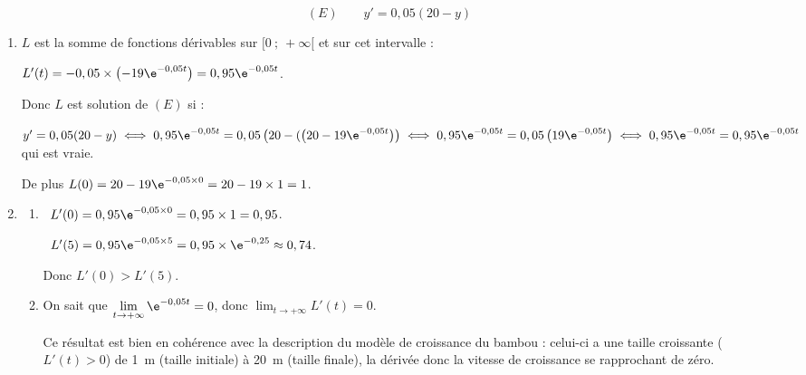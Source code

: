 \[(E) \qquad y' = 0,05(20 - y)\]

%
%
%

\begin{enumerate}
\item %
$L$ est la somme  de fonctions dérivables sur $[0~;~+\infty[$ et sur cet intervalle :

$L'(t) = - 0,05 \times \left(- 19\e^{-0,05t}\right) = 0,95\e^{-0,05t}$.

Donc $L$ est solution de $(E)$ si :

$y' = 0,05(20 - y) \iff 0,95\e^{-0,05t} = 0,05\left(20 - (\left(20 - 19\e^{-0,05t}\right)\right) \iff  0,95\e^{-0,05t}  = 0,05\left (19\e^{-0,05t}\right) \iff  0,95\e^{-0,05t}  =  0,95\e^{-0,05t}$ qui est vraie.

De plus $L(0) = 20 - 19\e^{-0,05\times 0} = 20 - 19\times 1 = 1$.
\item %
	\begin{enumerate}
		\item %
		
\starredbullet~$L'(0) = 0,95\e^{-0,05\times 0} =  0,95 \times 1 =  0,95$.

\starredbullet~$L'(5) = 0,95\e^{-0,05\times 5} =  0,95 \times \e^{-0,25}  \approx  0,74$.

Donc $L'(0) > L'(5)$.
		\item %
		
On sait que $\displaystyle\lim_{t \to + \infty} \e^{-0,05t} = 0$, donc $\displaystyle\lim_{t \to + \infty} L'(t) = 0$.

Ce résultat est bien en cohérence avec la description du modèle de croissance du bambou : celui-ci a une taille croissante ($L'(t) > 0$) de 1~m (taille initiale)  à 20~m (taille finale), la dérivée  donc la vitesse de croissance se rapprochant de zéro.
	\end{enumerate}
\end{enumerate}

\bigskip

